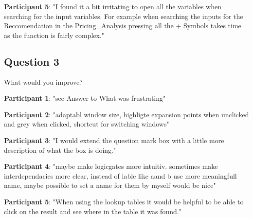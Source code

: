 \textbf{Participant 5}: "I found it a bit irritating to open all the variables when searching for the input variables. For example when searching the inputs for the Reccomendation in the Pricing\_Analysis pressing all the + Symbols takes time as the function is fairly complex."

\subsection*{Question 3}
What would you improve?

\textbf{Participant 1}: "see Answer to What was frustrating"

\textbf{Participant 2}: "adaptabl window size, highligte expansion points when unclicked and grey when clicked, shortcut for switching windows"


\textbf{Participant 3}: "I would extend the question mark box with a little more description of what the box is doing."


\textbf{Participant 4}: "maybe make logicgates more intuitiv. sometimes make interdependacies more clear, instead of lable like aand b use more meaningfull name, maybe possible to set a name for them by myself would be nice"


\textbf{Participant 5}: "When using the lookup tables it would be helpful to be able to click on the result and see where in the table it was found."

